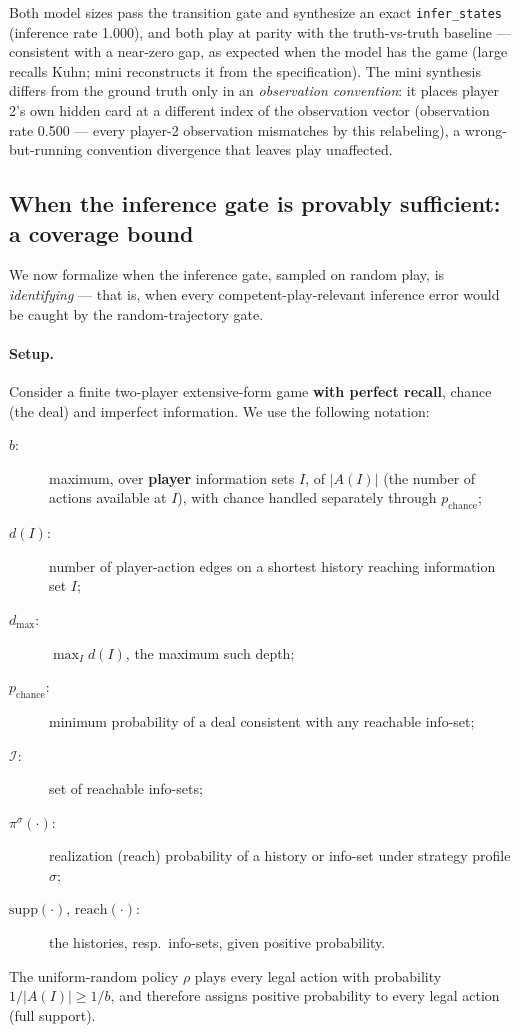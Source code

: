 \documentclass[11pt]{article}
\theoremstyle{remark}
\newcommand{\dmax}{d_{\max}}
\newcommand{\Ireach}{\mathcal{I}}
\begin{document}
Both model sizes pass the transition gate and synthesize an exact \texttt{infer\_states} (inference rate 1.000), and both play at parity with the truth-vs-truth baseline --- consistent with a near-zero gap, as expected when the model has the game (large recalls Kuhn; mini reconstructs it from the specification). The mini synthesis differs from the ground truth only in an \emph{observation convention}: it places player 2's own hidden card at a different index of the observation vector (observation rate 0.500 --- every player-2 observation mismatches by this relabeling), a wrong-but-running convention divergence that leaves play unaffected.

\subsection{When the inference gate is provably sufficient: a coverage bound}
\label{sec:coverage-bound}

We now formalize when the inference gate, sampled on random play, is \emph{identifying} --- that is, when every competent-play-relevant inference error would be caught by the random-trajectory gate.

\paragraph{Setup.} Consider a finite two-player extensive-form game \textbf{with perfect recall}, chance (the deal) and imperfect information. We use the following notation:
\begin{description}
\item[$b$:] maximum, over \textbf{player} information sets $I$, of $|A(I)|$ (the number of actions available at $I$), with chance handled separately through $p_{\text{chance}}$;
\item[$d(I)$:] number of player-action edges on a shortest history reaching information set $I$;
\item[$\dmax$:] $\max_I d(I)$, the maximum such depth;
\item[$p_{\text{chance}}$:] minimum probability of a deal consistent with any reachable info-set;
\item[$\Ireach$:] set of reachable info-sets;
\item[$\pi^\sigma(\cdot)$:] realization (reach) probability of a history or info-set under strategy profile $\sigma$;
\item[$\mathrm{supp}(\cdot)$, $\mathrm{reach}(\cdot)$:] the histories, resp.\ info-sets, given positive probability.
\end{description}
The uniform-random policy $\rho$ plays every legal action with probability $1/|A(I)| \geq 1/b$, and therefore assigns positive probability to every legal action (full support).
\end{document}
